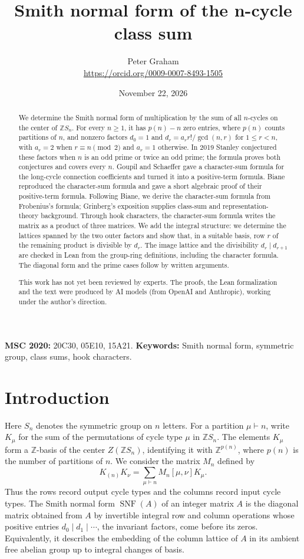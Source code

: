 \documentclass[11pt]{article}
\title{Smith normal form of the n-cycle class sum}
\author{Peter Graham\\ \small\url{https://orcid.org/0009-0007-8493-1505}}
\date{November 22, 2026}
\theoremstyle{remark}
\newcommand{\Z}{\mathbb{Z}}
\newcommand{\SNF}{\operatorname{SNF}}
\begin{document}
\maketitle
\begin{abstract}
We determine the Smith normal form of multiplication by the sum of all
$n$-cycles on the center of $\Z S_n$. For every $n\geq1$, it has
$p(n)-n$ zero entries, where $p(n)$ counts partitions of $n$, and
nonzero factors $d_0=1$ and $d_r=a_r r!/\gcd(n,r)$ for $1\le r<n$,
with $a_r=2$ when $r\equiv n\pmod2$ and $a_r=1$ otherwise.
In 2019 Stanley conjectured these factors when $n$ is an odd prime or
twice an odd prime; the formula proves both conjectures and covers every $n$.
Goupil and Schaeffer gave a character-sum formula for the long-cycle
connection coefficients and turned it into a positive-term formula.
Biane reproduced the character-sum formula and gave a short algebraic
proof of their positive-term formula. Following Biane, we derive the
character-sum formula from Frobenius's formula; Grinberg's exposition
supplies class-sum and representation-theory background. Through hook characters, the
character-sum formula writes the matrix as a product of three matrices. We add the
integral structure: we determine the lattices spanned by the two outer
factors and show that, in a suitable basis, row $r$ of the remaining
product is divisible by $d_r$.
The image lattice and the divisibility $d_r\mid d_{r+1}$ are checked in
Lean from the group-ring definitions, including the character formula.
The diagonal form and the prime cases follow by written arguments.

This work has not yet been reviewed by experts. The proofs, the Lean formalization and the text were produced by AI models (from OpenAI and Anthropic), working under the author's direction.
\end{abstract}
\medskip

\noindent\textbf{MSC 2020:} 20C30, 05E10, 15A21.
\textbf{Keywords:} Smith normal form, symmetric group, class sums,
hook characters.

\section{Introduction}
Here $S_n$ denotes the symmetric group on $n$ letters.
For a partition $\mu\vdash n$, write $K_\mu$ for the sum of the
permutations of cycle type $\mu$ in $\Z S_n$. The elements $K_\mu$ form
a $\Z$-basis of the center $Z(\Z S_n)$, identifying it with
$\Z^{p(n)}$, where $p(n)$ is the number of partitions of $n$.
We consider the matrix $M_n$ defined by
\begin{equation}\label{eq:matrix}
 K_{(n)}K_\nu=\sum_{\mu\vdash n}M_n[\mu,\nu]K_\mu.
\end{equation}
Thus the rows record output cycle types and the columns record input cycle
types. The Smith normal form $\SNF(A)$ of an integer matrix $A$ is the
diagonal matrix obtained from $A$ by invertible integral row and column
operations whose positive entries $d_0\mid d_1\mid\cdots$, the
invariant factors, come before its zeros. Equivalently, it describes the
embedding of the column lattice of $A$ in its ambient free abelian group
up to integral changes of basis.
\end{document}
